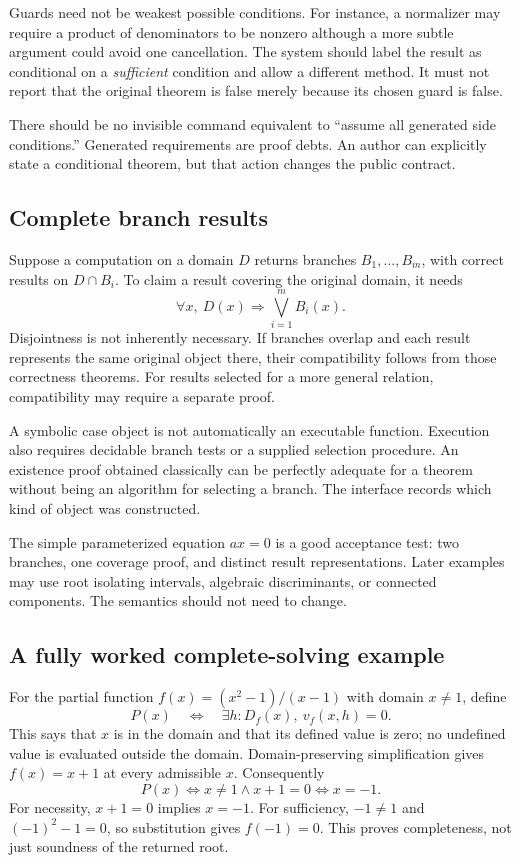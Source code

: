 \documentclass[11pt,a4paper]{article}
\theoremstyle{remark}
\begin{document}
Guards need not be weakest possible conditions. For instance, a normalizer may
require a product of denominators to be nonzero although a more subtle argument
could avoid one cancellation. The system should label the result as conditional
on a \emph{sufficient} condition and allow a different method. It must not report
that the original theorem is false merely because its chosen guard is false.

There should be no invisible command equivalent to ``assume all generated side
conditions.'' Generated requirements are proof debts. An author can explicitly
state a conditional theorem, but that action changes the public contract.

\subsection{Complete branch results}
Suppose a computation on a domain $D$ returns branches $B_1,\ldots,B_m$, with
correct results on $D\cap B_i$. To claim a result covering the original domain,
it needs
\[
 \forall x,\ D(x)\Longrightarrow\bigvee_{i=1}^m B_i(x).
\]
Disjointness is not inherently necessary. If branches overlap and each result
represents the same original object there, their compatibility follows from
those correctness theorems. For results selected for a more general relation,
compatibility may require a separate proof.

A symbolic case object is not automatically an executable function. Execution
also requires decidable branch tests or a supplied selection procedure. An
existence proof obtained classically can be perfectly adequate for a theorem
without being an algorithm for selecting a branch. The interface records which
kind of object was constructed.

The simple parameterized equation $ax=0$ is a good acceptance test: two branches,
one coverage proof, and distinct result representations. Later examples may use
root isolating intervals, algebraic discriminants, or connected components.
The semantics should not need to change.

\subsection{A fully worked complete-solving example}
For the partial function $f(x)=(x^2-1)/(x-1)$ with domain $x\ne1$, define
\[
 P(x)\quad\Longleftrightarrow\quad
 \exists h:D_f(x),\ v_f(x,h)=0.
\]
This says that $x$ is in the domain and that its defined value is zero;
no undefined value is evaluated outside the domain.
Domain-preserving simplification gives $f(x)=x+1$ at every admissible $x$.
Consequently
\[
 P(x)\Longleftrightarrow x\ne1\wedge x+1=0
       \Longleftrightarrow x=-1.
\]
For necessity, $x+1=0$ implies $x=-1$. For sufficiency, $-1\ne1$ and
$(-1)^2-1=0$, so substitution gives $f(-1)=0$. This proves completeness, not just
soundness of the returned root.
\end{document}
